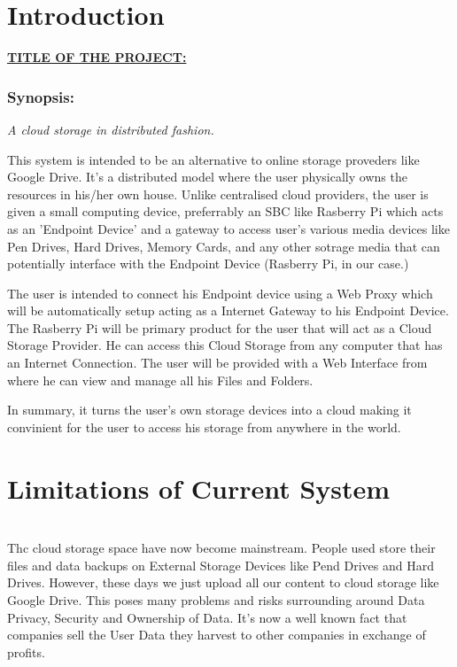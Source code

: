 \documentclass[12pt]{article}
\makeatletter
\let\inserttitle\@title
\makeatother
\begin{document}
\section{Introduction}
\vspace{1cm}
\textbf{\ul\uppercase{Title of the Project:}} \quad\textbf{\MakeUppercase{\inserttitle}}
\bigskip
\subsubsection{Synopsis:} \quad\quad
\textit{A cloud storage in distributed fashion.} \\ \par
This system is intended to be an alternative to online storage proveders like Google Drive. It's a distributed model where the user physically owns the resources in his/her own house. Unlike centralised cloud providers, the user is given a small computing device, preferrably an SBC like Rasberry Pi which acts as an 'Endpoint Device' and a gateway to access user's various media devices like Pen Drives, Hard Drives, Memory Cards, and any other sotrage media that can potentially interface with the Endpoint Device (Rasberry Pi, in our case.) \\ \par
The user is intended to connect his Endpoint device using a Web Proxy which will be automatically setup acting as a Internet Gateway to his Endpoint Device. The Rasberry Pi will be primary product for the user that will act as a Cloud Storage Provider. He can access this Cloud Storage from any computer that has an Internet Connection. The user will be provided with a Web Interface from where he can view and manage all his Files and Folders. \\
\par
In summary, it turns the user's own storage devices into a cloud making it convinient for the user to access his storage from anywhere in the world.


\section{Limitations of Current System}
\vspace{2cm} \\
\quad\quad Thc cloud storage space have now become mainstream. People used store their files and data backups on External Storage Devices like Pend Drives and Hard Drives. However, these days we just upload all our content to cloud storage like Google Drive. This poses many problems and risks surrounding around Data Privacy, Security and Ownership of Data. It's now a well known fact that companies sell the User Data they harvest to other companies in exchange of profits. \\
\end{document}
